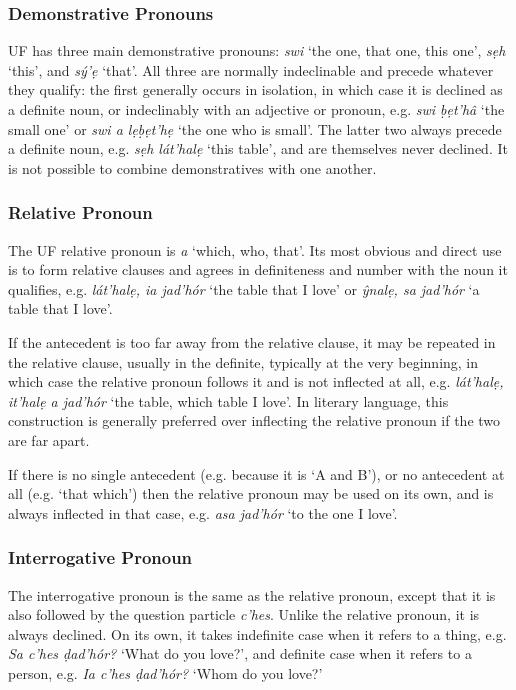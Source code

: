 \documentclass[a4paper, 12pt, twoside, final]{article}
\let \w \textit
\begin{document}
\subsubsection{Demonstrative Pronouns}
UF has three main demonstrative pronouns: \w{swi} ‘the one, that one, this one’, \w{sẹh} ‘this’, and \w{sý’ẹ} ‘that’. All
three are normally indeclinable and precede whatever they qualify: the first generally occurs in isolation, in which
case it is declined as a definite noun, or indeclinably with an adjective or pronoun, e.g. \w{swi ḅẹt’hâ} ‘the small one’
or \w{swi a lẹḅẹt’hẹ} ‘the one who is small’. The latter two always precede a definite noun, e.g. \w{sẹh lát’halẹ} ‘this table’,
and are themselves never declined. It is not possible to combine demonstratives with one another.

\subsubsection{Relative Pronoun}
The UF relative pronoun is \w{a} ‘which, who, that’. Its most obvious and direct use is to form relative
clauses and agrees in definiteness and number with the noun it qualifies, e.g. \w{lát’halẹ, ia jad’hór} ‘the
table that I love’ or \w{ŷnalẹ, sa jad’hór} ‘a table that I love’.

If the antecedent is too far away from the relative clause, it may be repeated in the relative clause,
usually in the definite, typically at the very beginning, in which case the relative pronoun follows it and is not inflected at
all, e.g. \w{lát’halẹ, it’halẹ a jad’hór} ‘the table, which table I love’. In literary language, this
construction is generally preferred over inflecting the relative pronoun if the two are far apart.

If there is no single antecedent (e.g. because it is ‘A and B’), or no antecedent at all (e.g. ‘that which’) then the
relative pronoun may be used on its own, and is always inflected in that case, e.g.  \w{asa jad’hór} ‘to the
one I love’.

\subsubsection{Interrogative Pronoun}
The interrogative pronoun is the same as the relative pronoun, except that it is also followed by the
question particle \w{c’hes}. Unlike the relative pronoun, it is always declined. On its own, it takes
indefinite case when it refers to a thing, e.g. \w{Sa c’hes ḍad’hór?} ‘What do you love?’, and definite
case when it refers to a person, e.g. \w{Ia c’hes ḍad’hór?} ‘Whom do you love?’
\end{document}
